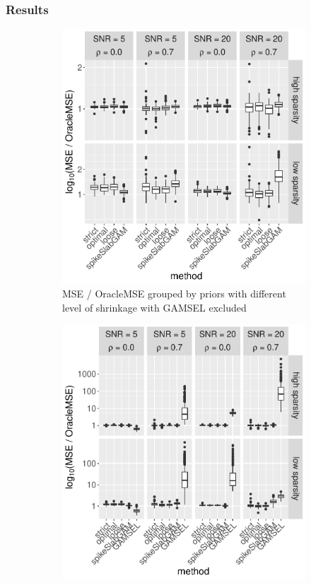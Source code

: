 \documentclass[12pt,letterpaper]{article}
\numberwithin{equation}{subsection}
\begin{document}
\subsubsection{Results}
\label{sec:sfres}
\begin{figure}[hbt!]
 \centering
\begin{subfigure}[b]{0.46\textwidth}
 \includegraphics[width=\textwidth]{../plots/sf-msea.pdf}
\caption {MSE / OracleMSE grouped by priors with different level of shrinkage with GAMSEL excluded}
 \label{fig:sf-msea}
\end{subfigure}\hfill
\begin{subfigure}[b]{0.46\textwidth}
 \includegraphics[width=\textwidth]{../plots/sf-mseb.pdf}

\end{subfigure}
\end{figure}
\end{document}
